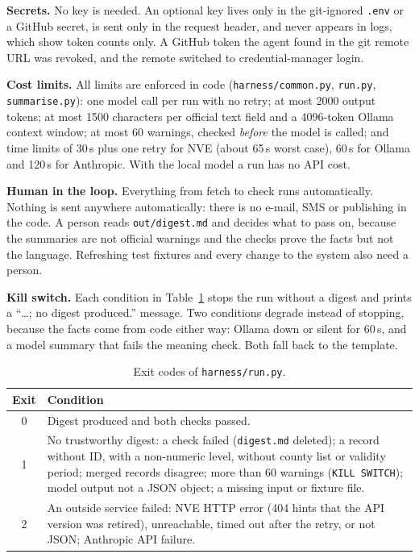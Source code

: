 \documentclass{article}
\newcommand{\code}[1]{\texttt{#1}}
\begin{document}
\textbf{Secrets.} No key is needed. An optional key lives only in the git-ignored \code{.env} or a GitHub secret, is sent only in the request header, and never appears in logs, which show token counts only. A GitHub token the agent found in the git remote URL was revoked, and the remote switched to credential-manager login.

\textbf{Cost limits.} All limits are enforced in code (\code{harness/common.py}, \code{run.py}, \code{summarise.py}): one model call per run with no retry; at most 2000 output tokens; at most 1500 characters per official text field and a 4096-token Ollama context window; at most 60 warnings, checked \emph{before} the model is called; and time limits of 30\,s plus one retry for NVE (about 65\,s worst case), 60\,s for Ollama and 120\,s for Anthropic. With the local model a run has no API cost.

\textbf{Human in the loop.} Everything from fetch to check runs automatically. Nothing is sent anywhere automatically: there is no e-mail, SMS or publishing in the code. A person reads \code{out/digest.md} and decides what to pass on, because the summaries are not official warnings and the checks prove the facts but not the language. Refreshing test fixtures and every change to the system also need a person.

\textbf{Kill switch.} Each condition in Table~\ref{tab:kill} stops the run without a digest and prints a ``\ldots; no digest produced.'' message. Two conditions degrade instead of stopping, because the facts come from code either way: Ollama down or silent for 60\,s, and a model summary that fails the meaning check. Both fall back to the template.

\begin{table}[htbp]
\centering
\small
\caption{Exit codes of \code{harness/run.py}.}
\label{tab:kill}
\begin{tabularx}{\textwidth}{@{}cX@{}}
\toprule
\textbf{Exit} & \textbf{Condition} \\
\midrule
0 & Digest produced and both checks passed. \\
1 & No trustworthy digest: a check failed (\code{digest.md} deleted); a record without ID, with a non-numeric level, without county list or validity period; merged records disagree; more than 60 warnings (\code{KILL SWITCH}); model output not a JSON object; a missing input or fixture file. \\
2 & An outside service failed: NVE HTTP error (404 hints that the API version was retired), unreachable, timed out after the retry, or not JSON; Anthropic API failure. \\
\bottomrule
\end{tabularx}
\end{table}
\end{document}

